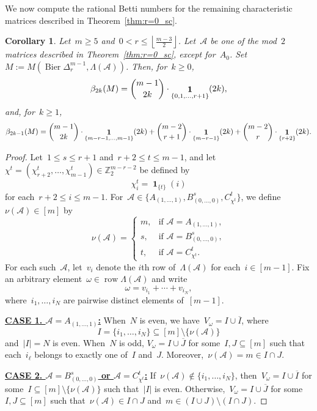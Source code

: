 \documentclass[11pt]{amsart}
\theoremstyle{plain}
\newtheorem{corollary}[theorem]{Corollary}
\numberwithin{equation}{section}
\theoremstyle{definition}
\newcommand{\Z}{\mathbb{Z}}
\newcommand{\cA}{\mathcal{A}}
\DeclareMathOperator{\row}{row}
\DeclareMathOperator{\Bier}{Bier}
\DeclareMathOperator{\ind}{\mathbf{1}}
\begin{document}
We now compute the rational Betti numbers for the remaining characteristic matrices described in Theorem~\ref{thm:r=0_sc}.
\begin{corollary}\label{thm:betti_r_positive}
    Let~$m\geq5$ and~$0<r\leq\left\lfloor\frac{m-3}{2}\right\rfloor$.
    Let~$\cA$ be one of the mod~$2$ matrices described in Theorem~\ref{thm:r=0_sc}, except for~$A_0$.
    Set~$M:=M(\Bier\Delta_r^{m-1},\Lambda(\cA))$.
    Then, for~$k\geq0$,
    $$
        \beta_{2k}(M) = \dbinom{m-1}{2k} \cdot \ind_{\{0,1,\ldots,r+1\}}(2k),
    $$
    and, for~$k\geq1$,
    $$
        \beta_{2k-1}(M) = \dbinom{m-1}{2k} \cdot \ind_{\{m-r-1,\ldots,m-1\}}(2k) + \dbinom{m-2}{r+1} \cdot \ind_{\{m-r-1\}}(2k) + \dbinom{m-2}{r} \cdot \ind_{\{r+2\}}(2k).
    $$
\end{corollary}
\begin{proof}
Let~$1\leq s\leq r+1$ and~$r+2\leq t\leq m-1$, and let~$\chi^t = (\chi^t_{r+2},\ldots,\chi^t_{m-1})\in\Z_2^{m-r-2}$ be defined by
$$
    \chi^t_i= \ind_{\{t\}}(i)
$$
for each~$r+2\leq i\leq m-1$.
For~$\cA\in \{ A_{(1,\ldots,1)}, B^s_{(0,\ldots,0)}, C^t_{\chi^t} \}$, we define~$\nu(\cA)\in[m]$ by
$$
    \nu(\cA)=
    \begin{cases}
        m, & \text{if } \cA = A_{(1,\ldots,1)},\\
        s, & \text{if } \cA=B^s_{(0,\ldots,0)},\\
        t, & \text{if } \cA=C^t_{\chi^t}.
    \end{cases}
$$
For each such~$\cA$, let~$v_i$ denote the $i$th row of~$\Lambda(\cA)$ for each~$i\in[m-1]$.
Fix an arbitrary element~$\omega\in\row\Lambda(\cA)$ and write
$$
    \omega=v_{i_1}+\cdots+v_{i_N},
$$
where~$i_1,\ldots,i_N$ are pairwise distinct elements of~$[m-1]$.

\noindent \underline{\textbf{CASE 1. $\cA = A_{(1,\ldots,1)}$:}}
When~$N$ is even, we have~$V_\omega=I\cup\overline{I}$, where
$$ 
    I=\{i_1,\ldots,i_N\}\subseteq[m]\setminus\{\nu(\cA)\} 
$$
and~$|I|=N$ is even.
When~$N$ is odd, $V_\omega=I\cup\overline{J}$ for some~$I,J\subseteq[m]$ such that each~$i_\ell$ belongs to exactly one of~$I$ and~$J$.
Moreover,~$\nu(\cA)=m\in I\cap J$.

\noindent \underline{\textbf{CASE 2. $\cA = B^s_{(0,\ldots,0)}$ or $\cA = C^t_{\chi^t}$:}}
If~$\nu(\cA) \notin \{i_1,\ldots,i_N\}$, then~$V_\omega = I \cup \overline{I}$ for some~$I\subseteq[m]\setminus\{\nu(\cA)\}$ such that~$|I|$ is even.
Otherwise,~$V_\omega=I\cup\overline{J}$ for some~$I,J\subseteq[m]$ such that~$\nu(\cA)\in I\cap J$ and~$m \in (I \cup J) \setminus (I \cap J)$.


\end{proof}
\end{document}
